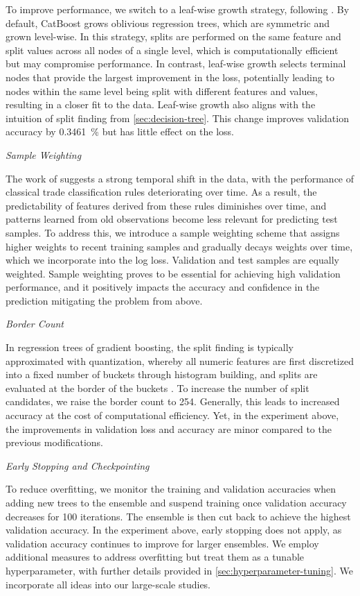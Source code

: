 To improve performance, we switch to a leaf-wise growth strategy, following \textcite[][786]{chenXGBoostScalableTree2016}. By default, CatBoost grows oblivious regression trees, which are symmetric and grown level-wise. In this strategy, splits are performed on the same feature and split values across all nodes of a single level, which is computationally efficient but may compromise performance. In contrast, leaf-wise growth selects terminal nodes that provide the largest improvement in the loss, potentially leading to nodes within the same level being split with different features and values, resulting in a closer fit to the data. Leaf-wise growth also aligns with the intuition of split finding from \cref{sec:decision-tree}. This change improves validation accuracy by \SI{0.3461}{\percent} but has little effect on the loss.

\emph{Sample Weighting}

The work of \textcite[][35]{grauerOptionTradeClassification2022} suggests a strong temporal shift in the data, with the performance of classical trade classification rules deteriorating over time.  As a result, the predictability of features derived from these rules diminishes over time, and patterns learned from old observations become less relevant for predicting test samples. To address this, we introduce a sample weighting scheme that assigns higher weights to recent training samples and gradually decays weights over time, which we incorporate into the log loss. Validation and test samples are equally weighted. Sample weighting proves to be essential for achieving high validation performance, and it positively impacts the accuracy and confidence in the prediction mitigating the problem from above.

\emph{Border Count}

In regression trees of gradient boosting, the split finding is typically approximated with quantization, whereby all numeric features are first discretized into a fixed number of buckets through histogram building, and splits are evaluated at the border of the buckets \autocite[][3147]{keLightGBMHighlyEfficient2017}. To increase the number of split candidates, we raise the border count to \num{254}. Generally, this leads to increased accuracy at the cost of computational efficiency. Yet, in the experiment above, the improvements in validation loss and accuracy are minor compared to the previous modifications.

\emph{Early Stopping and Checkpointing}

To reduce overfitting, we monitor the training and validation accuracies when adding new trees to the ensemble and suspend training once validation accuracy decreases for \num{100} iterations. The ensemble is then cut back to achieve the highest validation accuracy. In the experiment above, early stopping does not apply, as validation accuracy continues to improve for larger ensembles. We employ additional measures to address overfitting but treat them as a tunable hyperparameter, with further details provided in \cref{sec:hyperparameter-tuning}. We incorporate all ideas into our large-scale studies.

